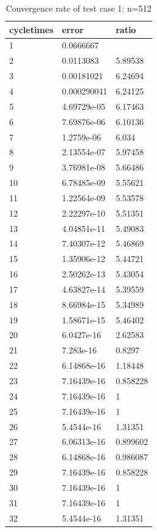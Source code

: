 \documentclass[UTF8]{ctexart}
\theoremstyle{plain}
\theoremstyle{definition}
\theoremstyle{remark}
\begin{document}
\begin{table}[H]
\centering
\begin{tabular}{|l|l|l|}
\hline
cycletimes & error & ratio\\
\hline
1 & 0.0666667& \\ \hline
2 & 0.0113083& 5.89538\\ \hline
3 & 0.00181021& 6.24694\\ \hline
4 & 0.000290041& 6.24125\\ \hline
5 & 4.69729e-05& 6.17463\\ \hline
6 & 7.69876e-06& 6.10136\\ \hline
7 & 1.2759e-06& 6.034\\ \hline
8 & 2.13554e-07& 5.97458\\ \hline
9 & 3.76981e-08& 5.66486\\ \hline
10 & 6.78485e-09& 5.55621\\ \hline
11 & 1.22564e-09& 5.53578\\ \hline
12 & 2.22297e-10& 5.51351\\ \hline
13 & 4.04851e-11& 5.49083\\ \hline
14 & 7.40307e-12& 5.46869\\ \hline
15 & 1.35906e-12& 5.44721\\ \hline
16 & 2.50262e-13& 5.43054\\ \hline
17 & 4.63827e-14& 5.39559\\ \hline
18 & 8.66984e-15& 5.34989\\ \hline
19 & 1.58671e-15& 5.46402\\ \hline
20 & 6.0427e-16& 2.62583\\ \hline
21 & 7.283e-16& 0.8297\\ \hline
22 & 6.14868e-16& 1.18448\\ \hline
23 & 7.16439e-16& 0.858228\\ \hline
24 & 7.16439e-16& 1\\ \hline
25 & 7.16439e-16& 1\\ \hline
26 & 5.4544e-16& 1.31351\\ \hline
27 & 6.06313e-16& 0.899602\\ \hline
28 & 6.14868e-16& 0.986087\\ \hline
29 & 7.16439e-16& 0.858228\\ \hline
30 & 7.16439e-16& 1\\ \hline
31 & 7.16439e-16& 1\\ \hline
32 & 5.4544e-16& 1.31351\\ \hline
\end{tabular}
\caption{Convergence rate of test case 1: n=512}
\end{table}
\end{document}
